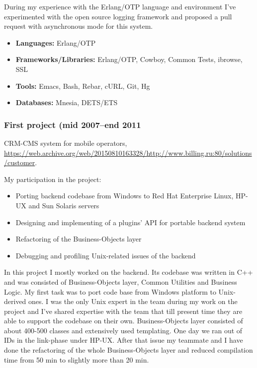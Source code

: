 During my experience with the Erlang/OTP language and environment I've
experimented with the open source logging framework and proposed a
pull request with asynchronous mode for this system.

\begin{itemize}[noitemsep, nosep]
  \item \textbf{Languages:} Erlang/OTP
  \item \textbf{Frameworks/Libraries:} Erlang/OTP, Cowboy, Common
Tests, ibrowse, SSL
  \item \textbf{Tools:} Emacs, Bash, Rebar, cURL, Git, Hg
  \item \textbf{Databases:} Mnesia, DETS/ETS
\end{itemize}

\subsubsection*{First project (mid 2007--end 2011}

CRM-CMS system for mobile operators,
\href{https://web.archive.org/web/20150810163328/http://www.billing.ru:80/solutions/customer}{\url{https://web.archive.org/web/20150810163328/http://www.billing.ru:80/solutions/customer}}.

My participation in the project:
\begin{itemize}[noitemsep, nosep]
  \item Porting backend codebase from Windows to Red Hat Enterprise
Linux, HP-UX and Sun Solaris servers
  \item Designing and implementing of a plugins' API for portable
backend system
  \item Refactoring of the Business-Objects layer
  \item Debugging and profiling Unix-related issues of the backend
\end{itemize}

In this project I mostly worked on the backend. Its codebase was
written in C++ and was consisted of Business-Objects layer, Common
Utilities and Business Logic. My first task was to port code base from
Windows platform to Unix-derived ones. I was the only Unix expert in
the team during my work on the project and I've shared expertise with
the team that till present time they are able to support the codebase
on their own. Business-Objects layer consisted of about 400-500
classes and extensively used templating. One day we ran out of IDs in
the link-phase under HP-UX. After that issue my teammate and I have
done the refactoring of the whole Business-Objects layer and reduced
compilation time from 50 min to slightly more than 20 min.

